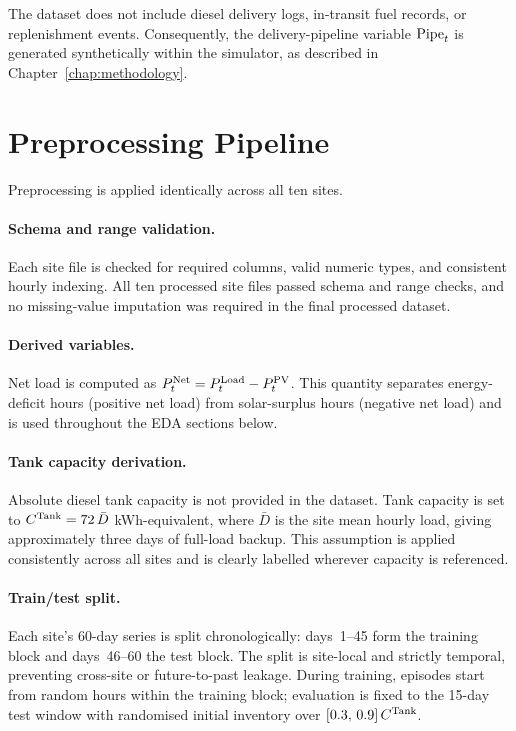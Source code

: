 The dataset does not include diesel delivery logs, in-transit fuel records, or
replenishment events.  Consequently, the delivery-pipeline variable $\mathrm{Pipe}_t$
is generated synthetically within the simulator, as described in
Chapter~\ref{chap:methodology}.  


\section{Preprocessing Pipeline}
\label{sec:preprocessing}

Preprocessing is applied identically across all ten sites.

\paragraph{Schema and range validation.}
Each site file is checked for required columns, valid numeric types, and
consistent hourly indexing.  All ten processed site files passed schema and
range checks, and no missing-value imputation was required in the final
processed dataset.

\paragraph{Derived variables.}
Net load is computed as $P_t^{\mathrm{Net}} = P_t^{\mathrm{Load}} - P_t^{\mathrm{PV}}$.  This
quantity separates energy-deficit hours (positive net load) from
solar-surplus hours (negative net load) and is used throughout the EDA
sections below.

\paragraph{Tank capacity derivation.}
Absolute diesel tank capacity is not provided in the dataset.  Tank capacity
is set to $C^{\mathrm{Tank}} = 72\,\bar{D}$ kWh-equivalent, where $\bar{D}$ is the
site mean hourly load, giving approximately three days of full-load backup.
This assumption is applied consistently across all sites and is clearly
labelled wherever capacity is referenced.

\paragraph{Train/test split.}
Each site's 60-day series is split chronologically: days~1--45 form the
training block and days~46--60 the test block.  The split is site-local and
strictly temporal, preventing cross-site or future-to-past leakage.  During
training, episodes start from random hours within the training block;
evaluation is fixed to the 15-day test window with randomised initial
inventory over $[0.3,\,0.9]\,C^{\mathrm{Tank}}$.

